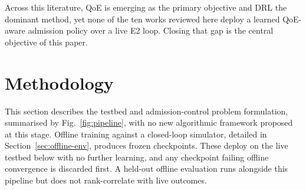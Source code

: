 \documentclass[10pt]{article}
\begin{document}
Across this literature, QoE is emerging as the primary objective and
DRL the dominant method, yet none of the ten works reviewed here
deploy a learned QoE-aware admission policy over a live E2 loop.
Closing that gap is the central objective of this paper.

\section{Methodology}
This section describes the testbed and admission-control problem
formulation, summarised by Fig.~\ref{fig:pipeline}, with no new
algorithmic framework proposed at this stage. Offline
training against a closed-loop simulator, detailed in
Section~\ref{sec:offline-env}, produces frozen checkpoints. These
deploy on the live testbed below with no further learning, and any
checkpoint failing offline convergence is discarded first. A held-out
offline evaluation runs alongside this pipeline but does not
rank-correlate with live outcomes.
\end{document}

